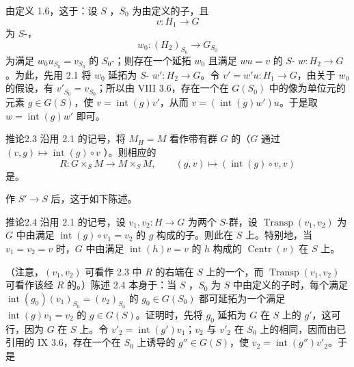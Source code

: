 由定义 1.6，这于：设 $S$ ，$S_0$ 为由定义的子，且
\[v:H_1\longrightarrow G\]
为 $S$-，
\[w_0:(H_2)_{S_0}\longrightarrow G_{S_0}\]
为满足 $w_0u_{S_0}=v_{S_0}$ 的 $S_0$-；则存在一个延拓 $w_0$ 且满足 $wu=v$ 的 $S$- $w:H_2\to G$。为此，先用 2.1 将 $w_0$ 延拓为 $S$- $w':H_2\to G$。令 $v'=w'u:H_1\to G$，由关于 $w_0$ 的假设，有 $v'_{S_0}=v_{S_0}$；所以由 VIII 3.6，存在一个在 $G(S_0)$ 中的像为单位元的元素 $g\in G(S)$，使 $v=\operatorname{int}(g)v'$，从而 $v=(\operatorname{int}(g)w')u$。于是取 $w=\operatorname{int}(g)w'$ 即可。
\begin{SGAresult}{推论}{2.3}
沿用 2.1 的记号，将 $M_H=M$ 看作带有群 $G$ 的（$G$ 通过 $(v,g)\mapsto\operatorname{int}(g)\circ v$ ）。则相应的
\[R:G\times_S M\longrightarrow M\times_S M,\qquad(g,v)\longmapsto(\operatorname{int}(g)\circ v,v)\]
是。
\end{SGAresult}
作 $S'\to S$ 后，这于如下陈述。
\begin{SGAresult}{推论}{2.4}
沿用 2.1 的记号，设 $v_1,v_2:H\to G$ 为两个 $S$-群，设 $\operatorname{Transp}(v_1,v_2)$ 为 $G$ 中由满足 $\operatorname{int}(g)\circ v_1=v_2$ 的 $g$ 构成的子。则此在 $S$ 上。特别地，当 $v_1=v_2=v$ 时，$G$ 中由满足 $\operatorname{int}(h)v=v$ 的 $h$ 构成的 $\operatorname{Centr}(v)$ 在 $S$ 上。
\end{SGAresult}
（注意，$(v_1,v_2)$ 可看作 2.3 中 $R$ 的右端在 $S$ 上的一个，而 $\operatorname{Transp}(v_1,v_2)$ 可看作该经 $R$ 的。）陈述 2.4 本身于：当 $S$ ，$S_0$ 为 $S$ 中由定义的子时，每个满足 $\operatorname{int}(g_0)(v_1)_{S_0}=(v_2)_{S_0}$ 的 $g_0\in G(S_0)$ 都可延拓为一个满足 $\operatorname{int}(g)v_1=v_2$ 的 $g\in G(S)$。证明时，先将 $g_0$ 延拓为 $G$ 在 $S$ 上的 $g'$，这可行，因为 $G$ 在 $S$ 上。令 $v'_2=\operatorname{int}(g')v_1$；$v_2$ 与 $v'_2$ 在 $S_0$ 上的相同，因而由已引用的 IX 3.6，存在一个在 $S_0$ 上诱导的 $g''\in G(S)$，使 $v_2=\operatorname{int}(g'')v'_2$。于是
